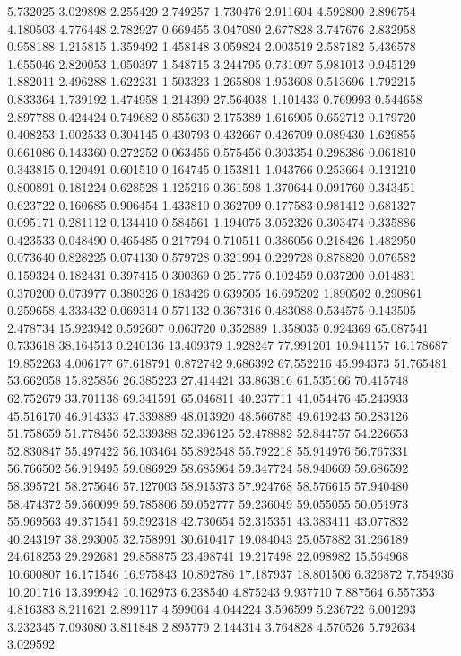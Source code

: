 5.732025
3.029898
2.255429
2.749257
1.730476
2.911604
4.592800
2.896754
4.180503
4.776448
2.782927
0.669455
3.047080
2.677828
3.747676
2.832958
0.958188
1.215815
1.359492
1.458148
3.059824
2.003519
2.587182
5.436578
1.655046
2.820053
1.050397
1.548715
3.244795
0.731097
5.981013
0.945129
1.882011
2.496288
1.622231
1.503323
1.265808
1.953608
0.513696
1.792215
0.833364
1.739192
1.474958
1.214399
27.564038
1.101433
0.769993
0.544658
2.897788
0.424424
0.749682
0.855630
2.175389
1.616905
0.652712
0.179720
0.408253
1.002533
0.304145
0.430793
0.432667
0.426709
0.089430
1.629855
0.661086
0.143360
0.272252
0.063456
0.575456
0.303354
0.298386
0.061810
0.343815
0.120491
0.601510
0.164745
0.153811
1.043766
0.253664
0.121210
0.800891
0.181224
0.628528
1.125216
0.361598
1.370644
0.091760
0.343451
0.623722
0.160685
0.906454
1.433810
0.362709
0.177583
0.981412
0.681327
0.095171
0.281112
0.134410
0.584561
1.194075
3.052326
0.303474
0.335886
0.423533
0.048490
0.465485
0.217794
0.710511
0.386056
0.218426
1.482950
0.073640
0.828225
0.074130
0.579728
0.321994
0.229728
0.878820
0.076582
0.159324
0.182431
0.397415
0.300369
0.251775
0.102459
0.037200
0.014831
0.370200
0.073977
0.380326
0.183426
0.639505
16.695202
1.890502
0.290861
0.259658
4.333432
0.069314
0.571132
0.367316
0.483088
0.534575
0.143505
2.478734
15.923942
0.592607
0.063720
0.352889
1.358035
0.924369
65.087541
0.733618
38.164513
0.240136
13.409379
1.928247
77.991201
10.941157
16.178687
19.852263
4.006177
67.618791
0.872742
9.686392
67.552216
45.994373
51.765481
53.662058
15.825856
26.385223
27.414421
33.863816
61.535166
70.415748
62.752679
33.701138
69.341591
65.046811
40.237711
41.054476
45.243933
45.516170
46.914333
47.339889
48.013920
48.566785
49.619243
50.283126
51.758659
51.778456
52.339388
52.396125
52.478882
52.844757
54.226653
52.830847
55.497422
56.103464
55.892548
55.792218
55.914976
56.767331
56.766502
56.919495
59.086929
58.685964
59.347724
58.940669
59.686592
58.395721
58.275646
57.127003
58.915373
57.924768
58.576615
57.940480
58.474372
59.560099
59.785806
59.052777
59.236049
59.055055
50.051973
55.969563
49.371541
59.592318
42.730654
52.315351
43.383411
43.077832
40.243197
38.293005
32.758991
30.610417
19.084043
25.057882
31.266189
24.618253
29.292681
29.858875
23.498741
19.217498
22.098982
15.564968
10.600807
16.171546
16.975843
10.892786
17.187937
18.801506
6.326872
7.754936
10.201716
13.399942
10.162973
6.238540
4.875243
9.937710
7.887564
6.557353
4.816383
8.211621
2.899117
4.599064
4.044224
3.596599
5.236722
6.001293
3.232345
7.093080
3.811848
2.895779
2.144314
3.764828
4.570526
5.792634
3.029592
